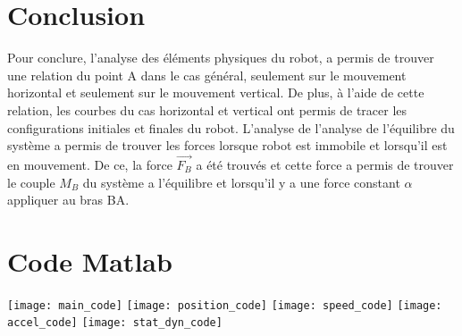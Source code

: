\documentclass{article}
\begin{document}
\section{Conclusion}
\noindent
Pour conclure, l'analyse des éléments physiques du robot, a permis de trouver une relation du point A dans le cas général, seulement sur le mouvement horizontal et seulement sur le mouvement vertical. De plus, à l'aide de cette relation, les courbes du cas horizontal et vertical ont permis de tracer les configurations initiales et finales du robot. L'analyse de l'analyse de l'équilibre du système a permis de trouver les forces lorsque robot est immobile et lorsqu'il est en mouvement. De ce, la force $\overrightarrow{F_B}$ a été trouvés et cette force a permis de trouver le couple $M_B$ du système a l'équilibre et lorsqu'il y a une force constant $\alpha$ appliquer au bras BA.

\section{Code Matlab}
\noindent \texttt{[image: main\_code]}
\newline
\newline
\noindent \texttt{[image: position\_code]}
\newline
\newline
\noindent \texttt{[image: speed\_code]}
\newline
\newline
\noindent \texttt{[image: accel\_code]}
\newline
\newline
\noindent \texttt{[image: stat\_dyn\_code]}
\end{document}

